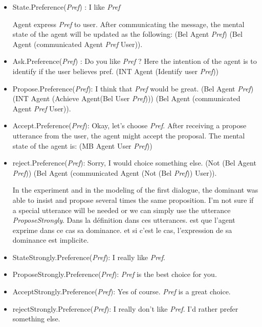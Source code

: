 \documentclass{llncs}
\begin{document}
 \begin{itemize}
 \item State.Preference(\textit{Pref}) : I like \textit{Pref} 
 \par Agent express \textit{Pref} to user. After communicating the message, the mental state of the agent will be updated as the following: 
  \newline (Bel Agent \textit{Pref})
  \newline (Bel Agent (communicated Agent \textit{Pref} User)).
  
 \item Ask.Preference(\textit{Pref}) : Do you like \textit{Pref} ?
 \newline  Here the intention of the agent is to identify if the user believes pref. 
 \newline (INT Agent (Identify user \textit{Pref}))
 \item Propose.Preference(\textit{Pref}): I think that \textit{Pref} would be great.
  \newline (Bel Agent \textit{Pref})
  \newline(INT Agent (Achieve Agent(Bel User \textit{Pref})))
  \newline (Bel Agent (communicated Agent \textit{Pref} User)).
 \item Accept.Preference(\textit{Pref}): Okay, let's choose \textit{Pref}. After receiving a propose utterance from the user, the agent might accept the proposal. The mental state of the agent is: 
 \newline (MB Agent User \textit{Pref})) 

 \item reject.Preference(\textit{Pref}): Sorry, I would choice something else.
  \newline (Not (Bel Agent \textit{Pref}))
  \newline (Bel Agent (communicated Agent (Not (Bel \textit{Pref})) User)).
  
\par 
  	In the experiment and in the modeling of the first dialogue, the dominant was able to insist and propose several times the same proposition. I'm not sure if a special utterance will be needed or we can simply use the utterance \textit{ProposeStrongly}. 
Dans la définition dans ces utterances. est que l'agent exprime dans ce cas sa dominance. et si c'est le cas, l'expression de sa dominance est implicite. 
 \item StateStrongly.Preference(\textit{Pref}): I really like \textit{Pref}.
 \item ProposeStrongly.Preference(\textit{Pref}): \textit{Pref} is the best choice for you.
 \item AcceptStrongly.Preference(\textit{Pref}): Yes of course. \textit{Pref} is a great choice.
  \item rejectStrongly.Preference(\textit{Pref}): I really don't like \textit{Pref}. I'd rather prefer something else.
 \end{itemize} 
\end{document}
